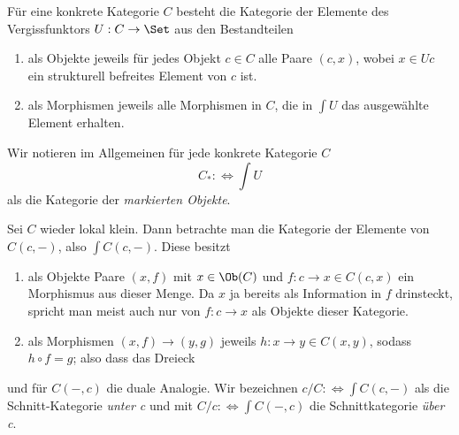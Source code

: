 \documentclass[11pt]{article}
\begin{document}
\begin{example}
    Für eine konkrete Kategorie $C$ besteht die Kategorie der Elemente des Vergissfunktors $U:C\to \Set$ aus den Bestandteilen
    \begin{enumerate}
        \item als Objekte jeweils für jedes Objekt $c\in C$ alle Paare $(c,x)$, wobei $x\in Uc$ ein strukturell befreites Element von $c$ ist.
        \item als Morphismen jeweils alle Morphismen in $C$, die in $\int U$ das ausgewählte Element erhalten.
    \end{enumerate}
\end{example}
\begin{note}
Wir notieren im Allgemeinen für jede konkrete Kategorie $C$
$$C_*:\Longleftrightarrow \int U$$
als die Kategorie der \emph{markierten Objekte}.   
\end{note}

\begin{example} \label{Schnittkategorie}Sei $C$ wieder lokal klein. Dann betrachte man die Kategorie der Elemente von $C(c,-)$, also $\int C(c,-)$. Diese besitzt 
\begin{enumerate}
    \item als Objekte Paare $(x,f)$ mit $x\in \Ob(C)$ und $f:c\to x \in C(c,x)$ ein Morphismus aus dieser Menge. Da $x$ ja bereits als Information in $f$ drinsteckt, spricht man meist auch nur von $f:c\to x$ als Objekte dieser Kategorie.
    \item als Morphismen $(x,f) \to (y,g)$ jeweils $h:x\to y\in C(x,y)$, sodass $h\circ f = g$; also dass das Dreieck 
    \begin{figure}[h]
    \centering
\end{figure}
\end{enumerate}
und für $C(-,c)$ die duale Analogie. Wir bezeichnen $c/C:\Leftrightarrow\int C(c,-)$ als die Schnitt-Kategorie \emph{unter c} und mit $C/c :\Leftrightarrow \int C(-,c)$ die Schnittkategorie \emph{über c}.
\end{example}
\end{document}
